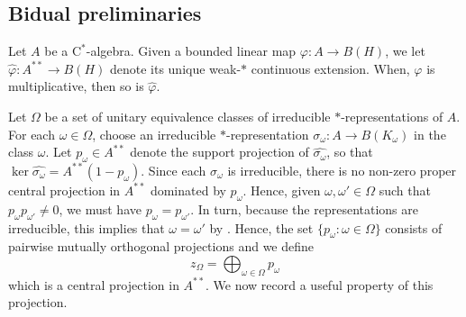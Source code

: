 \documentclass[10pt]{amsart}
\newcommand{\rC}{\mathrm{C}}
\renewcommand{\phi}{\varphi}
\theoremstyle{definition}
\begin{document}
\subsection{Bidual preliminaries}
 Let $A$ be a $\rC^*$-algebra.  Given a bounded linear map $\phi:A\to B(H)$, we let $\widehat\phi:A^{**}\to B(H)$ denote its unique weak-$*$ continuous extension. When, $\phi$ is multiplicative, then so is $\widehat\phi$. 

 Let $\Omega$ be a set of unitary equivalence classes of irreducible $*$-representations of $A$. For each $\omega\in \Omega$, choose an irreducible $*$-representation $\sigma_\omega:A\to B(K_\omega)$ in the class $\omega$. Let $p_\omega\in A^{**}$ denote the support projection of $\widehat{\sigma_\omega}$, so that $\ker \widehat{\sigma_\omega}=A^{**}(1-p_\omega)$. Since each $\sigma_\omega$ is irreducible, there is no non-zero proper central projection in $A^{**}$ dominated by $p_\omega$. Hence, given $\omega,\omega'\in \Omega$ such that $p_\omega p_{\omega'}\neq 0$, we must have $p_\omega=p_{\omega'}$. In turn, because the representations are irreducible, this implies that $\omega=\omega'$ by \cite[Corollary 3.8.10]{pedersen2018}. Hence, the set $\{p_\omega:\omega\in \Omega\}$ consists of pairwise mutually orthogonal projections and we define
\begin{equation}\label{Eq:zOmega}
z_\Omega=\bigoplus_{\omega\in \Omega}p_\omega
\end{equation}
which is a central projection in $A^{**}$. We now record a useful property of this projection.
\end{document}

